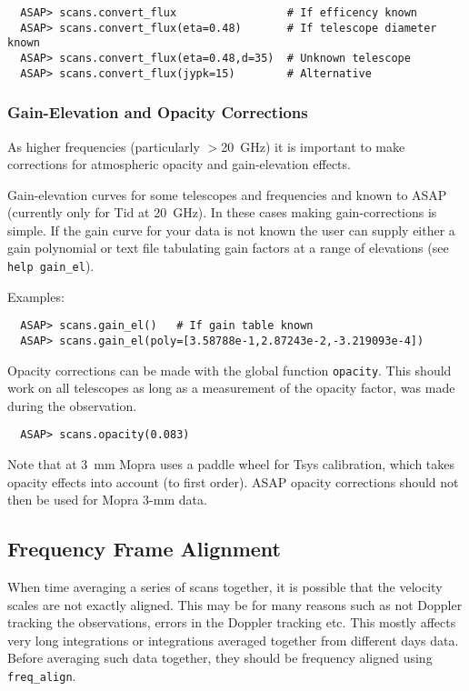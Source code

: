 \documentclass[11pt]{article}
\newcommand{\cmd}[1]{{\tt #1}}
\begin{document}
\begin{verbatim}
  ASAP> scans.convert_flux                 # If efficency known
  ASAP> scans.convert_flux(eta=0.48)       # If telescope diameter known
  ASAP> scans.convert_flux(eta=0.48,d=35)  # Unknown telescope
  ASAP> scans.convert_flux(jypk=15)        # Alternative
\end{verbatim}

\subsubsection{Gain-Elevation and Opacity Corrections}

As higher frequencies (particularly $>$20~GHz) it is important to make
corrections for atmospheric opacity and gain-elevation effects. 

Gain-elevation curves for some telescopes and frequencies and known to
ASAP (currently only for Tid at 20~GHz).  In these cases making
gain-corrections is simple.  If the gain curve for your data is not
known the user can supply either a gain polynomial or text file
tabulating gain factors at a range of elevations (see \cmd{help
gain\_el}). 

Examples:

\begin{verbatim}
  ASAP> scans.gain_el()   # If gain table known
  ASAP> scans.gain_el(poly=[3.58788e-1,2.87243e-2,-3.219093e-4])
\end{verbatim}

Opacity corrections can be made with the global function
\cmd{opacity}. This should work on all telescopes as long as a
measurement of the opacity factor, was made during the
observation.

\begin{verbatim}
  ASAP> scans.opacity(0.083)
\end{verbatim}

Note that at 3~mm Mopra uses a paddle wheel for Tsys calibration,
which takes opacity effects into account (to first order). ASAP
opacity corrections should not then be used for Mopra 3-mm data.

\subsection{Frequency Frame Alignment}

When time averaging a series of scans together, it is possible that the
velocity scales are not exactly aligned.  This may be for many reasons
such as not Doppler tracking the observations, errors in the Doppler
tracking etc.  This mostly affects very long integrations or
integrations averaged together from different days data.  Before
averaging such data together, they should be frequency aligned using
\cmd{freq\_align}. 
\end{document}
